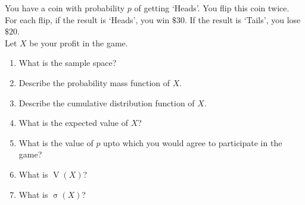 \documentclass[titlepage, fleqn, a4paper, 12pt, twoside]{article}
\theoremstyle{definition}
\theoremstyle{theorem}
\DeclareMathOperator{\var}{\mathrm{V}}
\DeclareMathOperator{\sd}{\mathrm{\sigma}}
\begin{document}
\begin{question}
	You have a coin with probability $p$ of getting `Heads'.
	You flip this coin twice.\\
	For each flip, if the result is `Heads', you win $\$30$.
	If the result is `Tails', you lose $\$20$.\\
	Let $X$ be your profit in the game.
	\begin{enumerate}
		\item What is the sample space?
		\item Describe the probability mass function of $X$.
		\item Describe the cumulative distribution function of $X$.
		\item What is the expected value of $X$?
		\item What is the value of $p$ upto which you would agree to participate in the game?
		\item What is $\var(X)$?
		\item What is $\sd(X)$?
	\end{enumerate}
\end{question}
\end{document}
